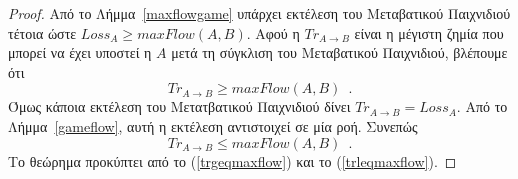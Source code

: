 \begin{proof}
  Από το Λήμμα~\ref{maxflowgame} υπάρχει εκτέλεση του Μεταβατικού Παιχνιδιού τέτοια ώστε $Loss_A \geq maxFlow\left(A,
  B\right)$. Αφού η $Tr_{A \rightarrow B}$ είναι η μέγιστη ζημία που μπορεί να έχει υποστεί η $A$ μετά τη σύγκλιση του
  Μεταβατικού Παιχνιδιού, βλέπουμε ότι
  \begin{equation}
  \label{trgeqmaxflow}
     Tr_{A \rightarrow B} \geq maxFlow\left(A, B\right) \enspace.
  \end{equation}
  Όμως κάποια εκτέλεση του Μετατβατικού Παιχνιδιού δίνει $Tr_{A \rightarrow B} = Loss_A$.
  Από το Λήμμα~\ref{gameflow}, αυτή η εκτέλεση αντιστοιχεί σε μία ροή. Συνεπώς
  \begin{equation}
  \label{trleqmaxflow}
     Tr_{A \rightarrow B} \leq maxFlow\left(A, B\right) \enspace.
  \end{equation}
  Το θεώρημα προκύπτει από το (\ref{trgeqmaxflow}) και το (\ref{trleqmaxflow}).
\end{proof}
